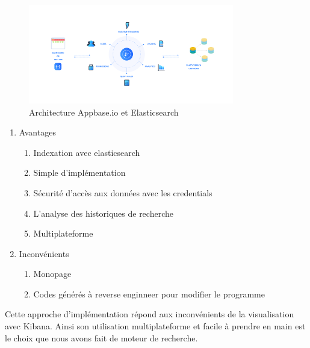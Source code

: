 \begin{figure}[h!]
  \centering
  \includegraphics[width=0.8\textwidth]{images/ArchitectureElasticsearchAppbase.png}
	\caption[]{Architecture Appbase.io et Elasticsearch}
  \label{}
\end{figure}

\begin{enumerate}
    \item Avantages 
        \begin{enumerate}
            \item Indexation avec elasticsearch
            \item Simple d’implémentation
            \item Sécurité d’accès aux données avec les credentials
            \item L’analyse des historiques de recherche
            \item Multiplateforme
        \end{enumerate}
    \item Inconvénients 
        \begin{enumerate}
        \item Monopage
        \item Codes générés à reverse enginneer pour modifier le programme
        \end{enumerate}
\end{enumerate}

Cette approche d’implémentation répond aux inconvénients de la visualisation avec Kibana. Ainsi son utilisation multiplateforme et facile à prendre en main est le choix que nous avons fait de moteur de recherche.  